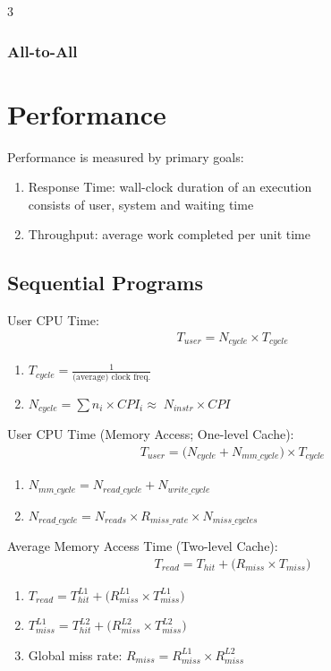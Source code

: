 \documentclass[12pt, a4paper]{article}
\begin{document}
\begin{multicols*}{3}
\subsubsection{All-to-All}
\begin{center}
\end{center}

\colbreak
\section{Performance}
Performance is measured by primary goals:
\begin{enumerate}[\roman*.]
  \item Response Time: wall-clock duration of an execution\\ 
    consists of user, system and waiting time
  \item Throughput: average work completed per unit time
\end{enumerate}

\subsection{Sequential Programs}
User CPU Time:
\begin{gather*}
  T_{user} = N_{cycle}\times T_{cycle}
\end{gather*}
\begin{enumerate}[\roman*.]
  \item $ T_{cycle} = \frac{1}{\text{(average) clock freq.}}$
  \item $ N_{cycle} = \sum n_i\times CPI_i\approx\; N_{instr}\times CPI$
\end{enumerate}\vspace{1em}

User CPU Time (Memory Access; One-level Cache):
\begin{gather*}
  T_{user} = \bigl(N_{cycle} + N_{mm\_cycle}\bigr)\times T_{cycle}
\end{gather*}
\begin{enumerate}[\roman*.]
  \item $ N_{mm\_cycle} = N_{read\_cycle} + N_{write\_cycle}$
  \item $ N_{read\_cycle} = N_{reads}\times R_{miss\_rate}\times N_{miss\_cycles}$
\end{enumerate}\vspace{1em}

Average Memory Access Time (Two-level Cache):
\begin{gather*}
  T_{read} = T_{hit} + \bigl(R_{miss}\times T_{miss}\bigr)
\end{gather*}
\begin{enumerate}[\roman*.]
  \item $ T_{read} = T^{L1}_{hit} + \bigl(R^{L1}_{miss}\times T^{L1}_{miss}\bigr)$
  \item $ T^{L1}_{miss} = T^{L2}_{hit} + \bigl(R^{L2}_{miss}\times T^{L2}_{miss}\bigr)$
  \item Global miss rate: $R_{miss} = R^{L1}_{miss}\times R^{L2}_{miss}$
\end{enumerate}\vspace{1em}


\end{multicols*}
\end{document}

